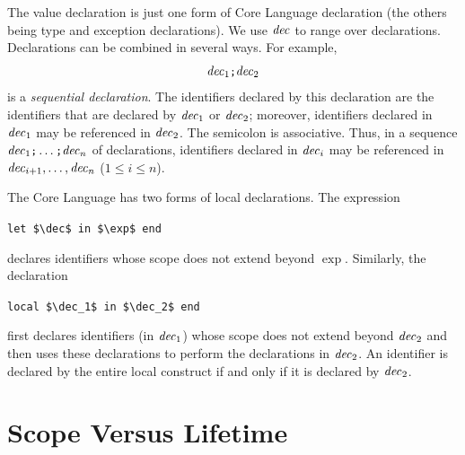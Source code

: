 \documentclass[12pt]{book}
\begin{document}
The value declaration is just one form of Core Language declaration (the others
being type and exception declarations). We use ${\it dec}$ to range over
declarations. Declarations can be combined in several ways. For example,
%
%
$${\it dec}_1\mbox{\small\ttfamily;}{\it dec}_2$$ is a {\em sequential declaration}. The identifiers
declared by this declaration are the identifiers that are declared by ${\it dec}_1$
or ${\it dec}_2$; moreover, identifiers declared in ${\it dec}_1$ may be referenced in
${\it dec}_2$. The
%
%
semicolon is associative. Thus, in a sequence
${\it dec}_1\mbox{\small\ttfamily;}\ldots\hbox{\tt ;}{\it dec}_n$ of declarations, identifiers declared in
${\it dec}_i$ may be referenced in ${\it dec}_{i+1},\ldots,{\it dec}_n$ ($1\leq i\leq n$).

The Core Language has two forms of
%
%
%
%
local declarations. The expression
\begin{center}
  \lstinline!let $\dec$ in $\exp$ end!
\end{center}
declares identifiers whose scope does not extend beyond $\exp$. Similarly, the
declaration
%
%
\begin{center}
  \lstinline!local $\dec_1$ in $\dec_2$ end!
\end{center}
first declares identifiers (in ${\it dec}_1$) whose scope does not extend beyond
${\it dec}_2$ and then uses these declarations to perform the declarations in
${\it dec}_2$. An identifier is declared by the entire local construct if and only if
it is declared by ${\it dec}_2$.

\section{Scope Versus Lifetime}
\label{scope.sec}
\end{document}
